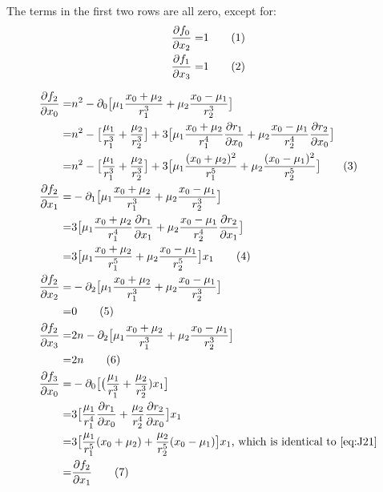 \documentclass[]{article}
\newcommand\numberthis{\addtocounter{equation}{1}\tag{\theequation}}
\begin{document}
The terms in the first two rows are all zero, except for:
\begin{align*}
	\frac{\partial f_0}{\partial x_2} =& 1 \numberthis \label{eq:J02}\\
	\frac{\partial f_1}{\partial x_3} =& 1 \numberthis \label{eq:J13}
\end{align*}

\begin{align*}
	\frac{\partial f_2}{\partial x_0} =& n^2 - \partial_0\big[\mu_1\frac{x_0+\mu_2}{r_1^3} + \mu_2\frac{x_0-\mu_1}{r_2^3}\big]\\
	=& n^2 -\big[\frac{\mu_1}{r_1^3} + \frac{\mu_2}{r_2^3}\big] + 3\big[\mu_1\frac{x_0+\mu_2}{r_1^4}\frac{\partial r_1}{\partial x_0} + \mu_2\frac{x_0-\mu_1}{r_2^4}\frac{\partial r_2}{\partial x_0}\big]\\
	=& n^2 -\big[\frac{\mu_1}{r_1^3} + \frac{\mu_2}{r_2^3}\big] + 3\big[\mu_1\frac{(x_0+\mu_2)^2}{r_1^5} + \mu_2\frac{(x_0-\mu_1)^2}{r_2^5}\big]\numberthis \label{eq:J20}\\
	\frac{\partial f_2}{\partial x_1} =& - \partial_1\big[\mu_1\frac{x_0+\mu_2}{r_1^3} + \mu_2\frac{x_0-\mu_1}{r_2^3}\big]\\
	=& 3 \big[\mu_1\frac{x_0+\mu_2}{r_1^4}\frac{\partial r_1}{\partial x_1} + \mu_2\frac{x_0-\mu_1}{r_2^4}\frac{\partial r_2}{\partial x_1}\big]\\
	=& 3 \big[\mu_1\frac{x_0+\mu_2}{r_1^5} + \mu_2\frac{x_0-\mu_1}{r_2^5}\big]x_1\numberthis \label{eq:J21}\\
	\frac{\partial f_2}{\partial x_2} =& - \partial_2\big[\mu_1\frac{x_0+\mu_2}{r_1^3} + \mu_2\frac{x_0-\mu_1}{r_2^3}\big]\\
	=& 0\numberthis \label{eq:J22}\\
	\frac{\partial f_2}{\partial x_3} =& 2n - \partial_2\big[\mu_1\frac{x_0+\mu_2}{r_1^3} + \mu_2\frac{x_0-\mu_1}{r_2^3}\big]\\
	=& 2n\numberthis \label{eq:J23}\\
	\frac{\partial f_3}{\partial x_0} =& - \partial_0\big[\big(\frac{\mu_1}{r_1^3} + \frac{\mu_2}{r_2^3})x_1\big]\\
	=& 3\big[\frac{\mu_1}{r_1^4}\frac{\partial r_1}{\partial x_0} + \frac{\mu_2}{r_2^4}\frac{\partial r_2}{\partial x_0}\big]x_1\\
	=& 3\big[\frac{\mu_1}{r_1^5}(x_0+\mu_2) + \frac{\mu_2}{r_2^5}(x_0-\mu_1)\big] x_1 \text{, which is identical to \eqref{eq:J21}} \\
	=& \frac{\partial f_2}{\partial x_1} \numberthis \label{eq:J30}\\

\end{align*}
\end{document}
